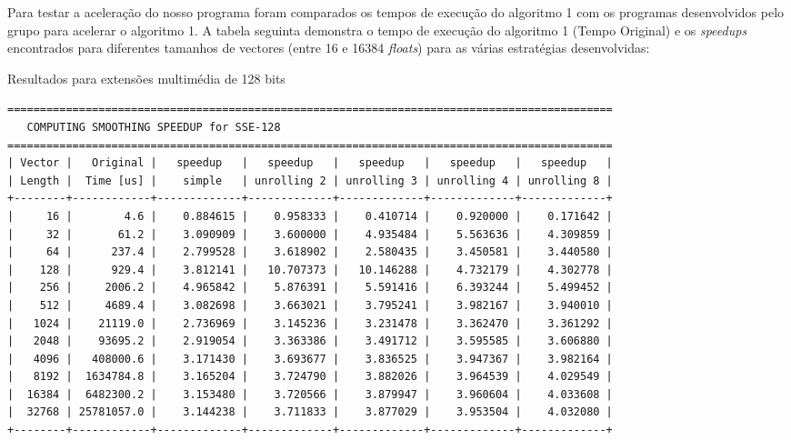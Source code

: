 \documentclass[a4paper]{article}
\begin{document}
	Para testar a aceleração do nosso programa foram comparados os tempos de execução do algoritmo 1 com os programas desenvolvidos pelo grupo para acelerar o algoritmo 1. A tabela seguinta demonstra o tempo de execução do algoritmo 1 (Tempo Original) e os \textit{speedups} encontrados para diferentes tamanhos de vectores (entre 16 e 16384 \textit{floats}) para as várias estratégias desenvolvidas:
	

	\begin{table}
	\caption{Resultados para extensões multimédia de 128 bits}
	\label{tab:results_128}
	\begin{Verbatim}[fontsize=\small,xleftmargin=-5mm]
=============================================================================================
   COMPUTING SMOOTHING SPEEDUP for SSE-128
=============================================================================================
| Vector |   Original |   speedup   |   speedup   |   speedup   |   speedup   |   speedup   |
| Length |  Time [us] |    simple   | unrolling 2 | unrolling 3 | unrolling 4 | unrolling 8 |
+--------+------------+-------------+-------------+-------------+-------------+-------------+
|     16 |        4.6 |    0.884615 |    0.958333 |    0.410714 |    0.920000 |    0.171642 |
|     32 |       61.2 |    3.090909 |    3.600000 |    4.935484 |    5.563636 |    4.309859 |
|     64 |      237.4 |    2.799528 |    3.618902 |    2.580435 |    3.450581 |    3.440580 |
|    128 |      929.4 |    3.812141 |   10.707373 |   10.146288 |    4.732179 |    4.302778 |
|    256 |     2006.2 |    4.965842 |    5.876391 |    5.591416 |    6.393244 |    5.499452 |
|    512 |     4689.4 |    3.082698 |    3.663021 |    3.795241 |    3.982167 |    3.940010 |
|   1024 |    21119.0 |    2.736969 |    3.145236 |    3.231478 |    3.362470 |    3.361292 |
|   2048 |    93695.2 |    2.919054 |    3.363386 |    3.491712 |    3.595585 |    3.606880 |
|   4096 |   408000.6 |    3.171430 |    3.693677 |    3.836525 |    3.947367 |    3.982164 |
|   8192 |  1634784.8 |    3.165204 |    3.724790 |    3.882026 |    3.964539 |    4.029549 |
|  16384 |  6482300.2 |    3.153480 |    3.720566 |    3.879947 |    3.960604 |    4.033608 |
|  32768 | 25781057.0 |    3.144238 |    3.711833 |    3.877029 |    3.953504 |    4.032080 |
+--------+------------+-------------+-------------+-------------+-------------+-------------+
	\end{Verbatim}
	\end{table}


	
\end{document}
